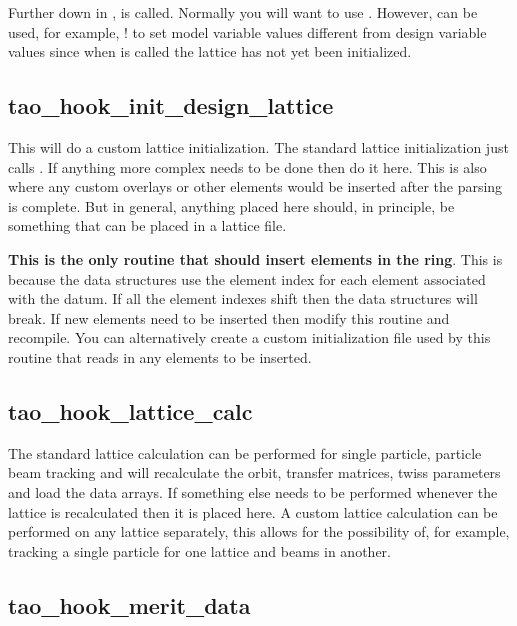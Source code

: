 {Further down in ,  is called. Normally you will want to use
. However,  can be used, for example, ! to set model variable
values different from design variable values since when  is called the 
lattice has not yet been initialized.

\subsection{tao_hook_init_design_lattice}

This will do a custom lattice initialization. The standard lattice initialization just calls
. If anything more complex needs to be done then do it here. This is also where any
custom overlays or other elements would be inserted after the parsing is complete. But in general,
anything placed here should, in principle, be something that can be placed in a lattice file.

\textbf{This is the only routine that should insert elements in the ring}. This is because the \tao
data structures use the element index for each element associated with the datum. If all the element
indexes shift then the data structures will break. If new elements need to be inserted then modify
this routine and recompile. You can alternatively create a custom initialization file used by this
routine that reads in any elements to be inserted.

\subsection{tao_hook_lattice_calc}

The standard lattice calculation can be performed for single particle, particle beam tracking and
will recalculate the orbit, transfer matrices, twiss parameters and load the data arrays. If
something else needs to be performed whenever the lattice is recalculated then it is placed here. A
custom lattice calculation can be performed on any lattice separately, this allows for the
possibility of, for example, tracking a single particle for one lattice and beams in another.

\subsection{tao_hook_merit_data}

}
